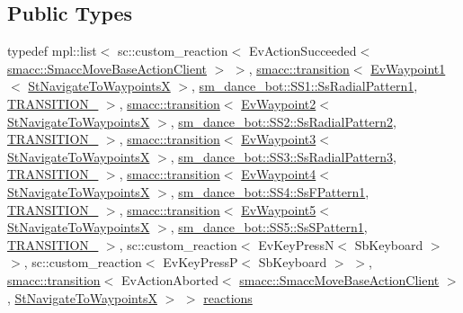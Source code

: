 \subsection*{Public Types}
\begin{DoxyCompactItemize}
\item 
typedef mpl\+::list$<$ sc\+::custom\+\_\+reaction$<$ Ev\+Action\+Succeeded$<$ \hyperlink{classsmacc_1_1SmaccMoveBaseActionClient}{smacc\+::\+Smacc\+Move\+Base\+Action\+Client} $>$ $>$, \hyperlink{classsmacc_1_1transition}{smacc\+::transition}$<$ \hyperlink{structEvWaypoint1}{Ev\+Waypoint1}$<$ \hyperlink{structStNavigateToWaypointsX}{St\+Navigate\+To\+WaypointsX} $>$, \hyperlink{structsm__dance__bot_1_1SS1_1_1SsRadialPattern1}{sm\+\_\+dance\+\_\+bot\+::\+S\+S1\+::\+Ss\+Radial\+Pattern1}, \hyperlink{structStNavigateToWaypointsX_1_1TRANSITION__1}{T\+R\+A\+N\+S\+I\+T\+I\+O\+N\+\_} $>$, \hyperlink{classsmacc_1_1transition}{smacc\+::transition}$<$ \hyperlink{structEvWaypoint2}{Ev\+Waypoint2}$<$ \hyperlink{structStNavigateToWaypointsX}{St\+Navigate\+To\+WaypointsX} $>$, \hyperlink{structsm__dance__bot_1_1SS2_1_1SsRadialPattern2}{sm\+\_\+dance\+\_\+bot\+::\+S\+S2\+::\+Ss\+Radial\+Pattern2}, \hyperlink{structStNavigateToWaypointsX_1_1TRANSITION__2}{T\+R\+A\+N\+S\+I\+T\+I\+O\+N\+\_} $>$, \hyperlink{classsmacc_1_1transition}{smacc\+::transition}$<$ \hyperlink{structEvWaypoint3}{Ev\+Waypoint3}$<$ \hyperlink{structStNavigateToWaypointsX}{St\+Navigate\+To\+WaypointsX} $>$, \hyperlink{structsm__dance__bot_1_1SS3_1_1SsRadialPattern3}{sm\+\_\+dance\+\_\+bot\+::\+S\+S3\+::\+Ss\+Radial\+Pattern3}, \hyperlink{structStNavigateToWaypointsX_1_1TRANSITION__3}{T\+R\+A\+N\+S\+I\+T\+I\+O\+N\+\_} $>$, \hyperlink{classsmacc_1_1transition}{smacc\+::transition}$<$ \hyperlink{structEvWaypoint4}{Ev\+Waypoint4}$<$ \hyperlink{structStNavigateToWaypointsX}{St\+Navigate\+To\+WaypointsX} $>$, \hyperlink{structsm__dance__bot_1_1SS4_1_1SsFPattern1}{sm\+\_\+dance\+\_\+bot\+::\+S\+S4\+::\+Ss\+F\+Pattern1}, \hyperlink{structStNavigateToWaypointsX_1_1TRANSITION__4}{T\+R\+A\+N\+S\+I\+T\+I\+O\+N\+\_} $>$, \hyperlink{classsmacc_1_1transition}{smacc\+::transition}$<$ \hyperlink{structEvWaypoint5}{Ev\+Waypoint5}$<$ \hyperlink{structStNavigateToWaypointsX}{St\+Navigate\+To\+WaypointsX} $>$, \hyperlink{structsm__dance__bot_1_1SS5_1_1SsSPattern1}{sm\+\_\+dance\+\_\+bot\+::\+S\+S5\+::\+Ss\+S\+Pattern1}, \hyperlink{structStNavigateToWaypointsX_1_1TRANSITION__5}{T\+R\+A\+N\+S\+I\+T\+I\+O\+N\+\_} $>$, sc\+::custom\+\_\+reaction$<$ Ev\+Key\+PressN$<$ Sb\+Keyboard $>$ $>$, sc\+::custom\+\_\+reaction$<$ Ev\+Key\+PressP$<$ Sb\+Keyboard $>$ $>$, \hyperlink{classsmacc_1_1transition}{smacc\+::transition}$<$ Ev\+Action\+Aborted$<$ \hyperlink{classsmacc_1_1SmaccMoveBaseActionClient}{smacc\+::\+Smacc\+Move\+Base\+Action\+Client} $>$, \hyperlink{structStNavigateToWaypointsX}{St\+Navigate\+To\+WaypointsX} $>$ $>$ \hyperlink{structStNavigateToWaypointsX_a0dcb831647342b0c35919dac0ce6818b}{reactions}
\end{DoxyCompactItemize}
